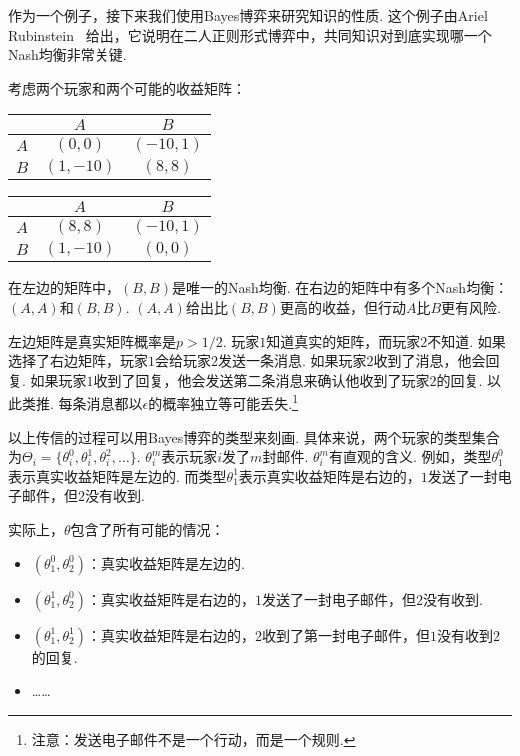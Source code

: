 作为一个例子，接下来我们使用Bayes博弈来研究知识的性质. 这个例子由Ariel Rubinstein~\cite{rubinsteinElectronicMailGame1989} 给出，它说明在二人正则形式博弈中，共同知识对到底实现哪一个Nash均衡非常关键.

考虑两个玩家和两个可能的收益矩阵：
\begin{table}[ht]
    \centering
\begin{tabular}{c|cc}
&$A$ & $B$ \\
\hline
$A$ & $(0, 0)$ & $(-10, 1)$ \\
$B$ & $(1, -10)$ & $(8, 8)$ \\
\end{tabular}
\qquad
\begin{tabular}{c|cc}
&$A$ & $B$ \\
\hline
$A$ & $(8, 8)$ & $(-10, 1)$ \\
$B$ & $(1, -10)$ & $(0, 0)$ \\
\end{tabular}
\end{table}

在左边的矩阵中，$(B,B)$是唯一的Nash均衡. 在右边的矩阵中有多个Nash均衡：$(A,A)$和$(B,B)$. $(A,A)$给出比$(B,B)$更高的收益，但行动$A$比$B$更有风险.

左边矩阵是真实矩阵概率是$p>1/2$. 玩家$1$知道真实的矩阵，而玩家$2$不知道. 如果选择了右边矩阵，玩家$1$会给玩家$2$发送一条消息. 如果玩家$2$收到了消息，他会回复. 如果玩家$1$收到了回复，他会发送第二条消息来确认他收到了玩家$2$的回复. 以此类推.  每条消息都以$\epsilon$的概率独立等可能丢失.\footnote{注意：发送电子邮件不是一个行动，而是一个规则.}  

以上传信的过程可以用Bayes博弈的类型来刻画. 具体来说，两个玩家的类型集合为$\Theta_i = \{\theta_i^0, \theta_i^1, \theta_i^2, \dots\}$. $\theta_i^m$表示玩家$i$发了$m$封邮件. $\theta_i^m$有直观的含义. 例如，类型$\theta_1^0$表示真实收益矩阵是左边的.  而类型$\theta_1^1$表示真实收益矩阵是右边的，$1$发送了一封电子邮件，但$2$没有收到. 

实际上，$\theta$包含了所有可能的情况：
\begin{itemize}
\item $(\theta_1^0, \theta_2^0)$：真实收益矩阵是左边的. 
\item $(\theta_1^1, \theta_2^0)$：真实收益矩阵是右边的，$1$发送了一封电子邮件，但$2$没有收到. 
\item $(\theta_1^1, \theta_2^1)$：真实收益矩阵是右边的，$2$收到了第一封电子邮件，但$1$没有收到$2$的回复. 
\item ……
\end{itemize}

